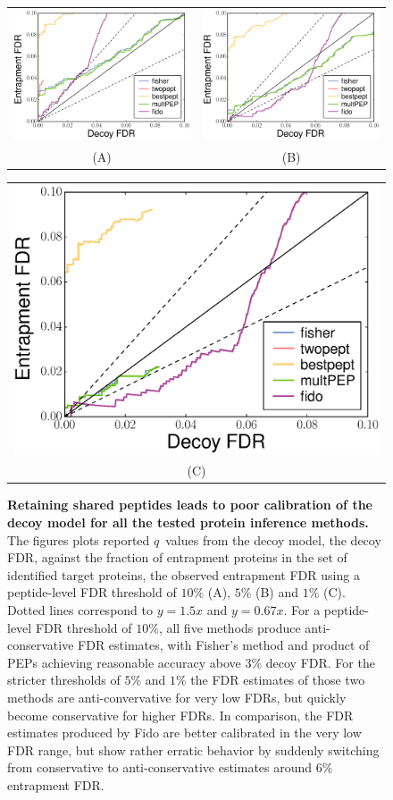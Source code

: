 \documentclass{article}
\begin{document}
\begin{figure}
\begin{center}
  \begin{tabular}{cc}
\includegraphics[width=0.45\linewidth]{
./img/shared-pept-accuracy-fdr10-with-fido-exact} &
\includegraphics[width=0.45\linewidth]{
./img/shared-pept-accuracy-fdr5-with-fido-exact}\\
  (A) & (B) 
  \end{tabular}
  \begin{tabular}{c}
\includegraphics[width=0.45\linewidth]{
./img/shared-pept-accuracy-fdr1-with-fido-exact}\\
  (C)
  \end{tabular}
\caption{\label{fig:shared-accuracy}\textbf{Retaining shared peptides
leads to poor calibration of the decoy model for all the tested
protein inference methods.} The figures plots reported $q$~values from
the decoy model, the decoy FDR, against the fraction of entrapment
proteins in the set of identified target proteins, the observed
entrapment FDR using a peptide-level FDR threshold of $10\%$ (A),
$5\%$ (B) and $1\%$ (C). Dotted lines correspond to $y=1.5x$ and
$y=0.67x$.  For a peptide-level FDR threshold of $10\%$, all five
methods produce anti-conservative FDR estimates, with Fisher's method
and product of PEPs achieving reasonable accuracy above $3\%$ decoy
FDR. For the stricter thresholds of $5\%$ and $1\%$ the FDR estimates
of those two methods are anti-convervative for very low FDRs, but
quickly become conservative for higher FDRs. In comparison, the FDR 
estimates produced by Fido are better calibrated in the very 
low FDR range, but show rather erratic behavior by suddenly switching 
from conservative to anti-conservative estimates around $6\%$ 
entrapment FDR.}
\end{center}
\end{figure}
\end{document}
